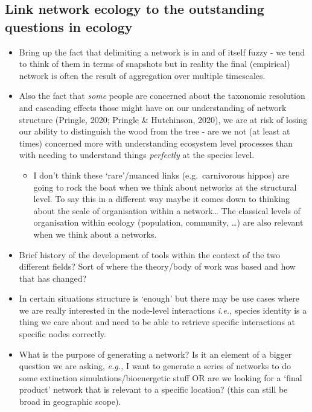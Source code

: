 \documentclass[
]{article}
\providecommand{\tightlist}{%
  \setlength{\itemsep}{0pt}\setlength{\parskip}{0pt}}\usepackage{longtable,booktabs,array}
\begin{document}
\subsection{Link network ecology to the outstanding questions in
ecology}\label{link-network-ecology-to-the-outstanding-questions-in-ecology}

\begin{itemize}
\item
  Bring up the fact that delimiting a network is in and of itself fuzzy
  - we tend to think of them in terms of snapshots but in reality the
  final (empirical) network is often the result of aggregation over
  multiple timescales.
\item
  Also the fact that \emph{some} people are concerned about the
  taxonomic resolution and cascading effects those might have on our
  understanding of network structure (Pringle, 2020; Pringle \&
  Hutchinson, 2020), we are at risk of losing our ability to distinguish
  the wood from the tree - are we not (at least at times) concerned more
  with understanding ecosystem level processes than with needing to
  understand things \emph{perfectly} at the species level.

  \begin{itemize}
  \tightlist
  \item
    I don't think these `rare'/nuanced links (e.g.~carnivorous hippos)
    are going to rock the boat when we think about networks at the
    structural level. To say this in a different way maybe it comes down
    to thinking about the scale of organisation within a network\ldots{}
    The classical levels of organisation within ecology (population,
    community, \ldots) are also relevant when we think about a networks.
  \end{itemize}
\item
  Brief history of the development of tools within the context of the
  two different fields? Sort of where the theory/body of work was based
  and how that has changed?
\item
  In certain situations structure is `enough' but there may be use cases
  where we are really interested in the node-level interactions
  \emph{i.e.,} species identity is a thing we care about and need to be
  able to retrieve specific interactions at specific nodes correctly.
\item
  What is the purpose of generating a network? Is it an element of a
  bigger question we are asking, \emph{e.g.,} I want to generate a
  series of networks to do some extinction simulations/bioenergetic
  stuff OR are we looking for a `final product' network that is relevant
  to a specific location? (this can still be broad in geographic scope).
\end{itemize}
\end{document}
